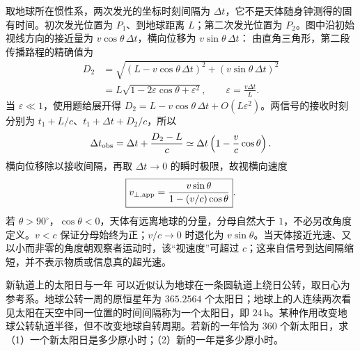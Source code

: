 {\begin{xesolution}
取地球所在惯性系，两次发光的坐标时刻间隔为 $\Delta t$，它不是天体随身钟测得的固有时间。初次发光位置为 $P_1$、到地球距离 $L$；第二次发光位置为 $P_2$。图中沿初始视线方向的接近量为 $v\cos\theta\,\Delta t$，横向位移为 $v\sin\theta\,\Delta t$：
\ApparentTransverseDiagram
由直角三角形，第二段传播路程的精确值为
\begin{align*}
D_2&=\sqrt{(L-v\cos\theta\,\Delta t)^2+(v\sin\theta\,\Delta t)^2}\\
&=L\sqrt{1-2\varepsilon\cos\theta+\varepsilon^2},
\qquad \varepsilon=\frac{v\Delta t}{L}.
\end{align*}
当 $\varepsilon\ll1$，使用题给展开得 $D_2=L-v\cos\theta\,\Delta t+O(L\varepsilon^2)$。两信号的接收时刻分别为 $t_1+L/c$、$t_1+\Delta t+D_2/c$，所以
\[
\Delta t_{\rm obs}=\Delta t+\frac{D_2-L}{c}
\simeq\Delta t\left(1-\frac vc\cos\theta\right).
\]
横向位移除以接收间隔，再取 $\Delta t\to0$ 的瞬时极限，故视横向速度
\[
\boxed{v_{\perp,\rm app}=\frac{v\sin\theta}{1-(v/c)\cos\theta}}.
\]
若 $\theta>90^\circ$，$\cos\theta<0$，天体有远离地球的分量，分母自然大于 $1$，不必另改角度定义。$v<c$ 保证分母始终为正；$v/c\to0$ 时退化为 $v\sin\theta$。当天体接近光速、又以小而非零的角度朝观察者运动时，该“视速度”可超过 $c$；这来自信号到达间隔缩短，并不表示物质或信息真的超光速。
\end{xesolution}


\begin{origexamplebox}{新轨道上的太阳日与一年}\label{ch04:ex:k11-2-104}
可以近似认为地球在一条圆轨道上绕日公转，取日心为参考系。地球公转一周的原恒星年为 $365.2564$ 个太阳日；地球上的人连续两次看见太阳在天空中同一位置的时间间隔称为一个太阳日，即 $24\,\mathrm h$。某种作用改变地球公转轨道半径，但不改变地球自转周期。若新的一年恰为 $360$ 个新太阳日，求（1）一个新太阳日是多少原小时；（2）新的一年是多少原小时。


\end{origexamplebox}}
